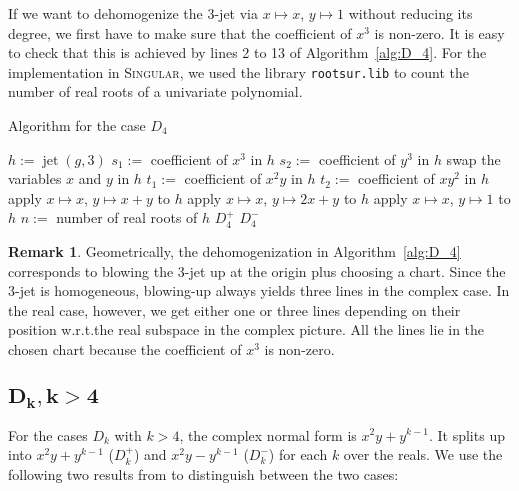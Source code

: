\documentclass[noend]{amsproc}
\theoremstyle{definition}
\newtheorem{remark}[theorem]{Remark}
\newcommand{\Singular}{\textsc{Singular}}
\DeclareMathOperator{\m}{\mathfrak{m}}
\DeclareMathOperator{\jet}{jet}
\begin{document}
If we want to dehomogenize the 3-jet via $x\mapsto x$, $y\mapsto 1$ without
reducing its degree, we first have to make sure that the coefficient of $x^3$
is non-zero. It is easy to check that this is achieved by lines 2 to 13 of
Algorithm~\ref{alg:D_4}. For the implementation in \Singular{}, we used the
library \texttt{rootsur.lib} \citep{roots} to count the number of real roots
of a univariate polynomial.

\begin{algorithm}[ht]
\caption{\label{alg:D_4}\label{D[4]} Algorithm for the case $D_4$}
\begin{algorithmic}[1]

\Require{$g\in \m^3\subset\mathbb Q[x,y]$ of complex singularity type $D_4$}
\State $h := \jet(g,3)$
\State $s_1:=$ coefficient of ${x^3}$ in $h$
\State $s_2 :=$ coefficient of ${y^3}$ in $h$
\State swap the variables $x$ and $y$ in $h$
\Else
\State $t_1:=$ coefficient of ${x^2y}$ in $h$
\State $t_2:=$ coefficient of ${xy^2}$ in $h$
\State apply $x\mapsto x$, $y\mapsto x+y$ to $h$
\Else
\State apply $x\mapsto x$, $y\mapsto 2x+y$ to $h$
\EndIf
\EndIf
\EndIf
\State apply $x\mapsto x$, $y\mapsto 1$ to $h$
\State $n :=$ number of real roots of $h$
\Return $D_4^+$
\Else
\Return $D_4^-$
\EndIf

\end{algorithmic}
\end{algorithm}

\begin{remark}
Geometrically, the dehomogenization in Algorithm~\ref{alg:D_4} corresponds to
blowing the 3-jet up at the origin plus choosing a chart. Since the 3-jet is
homogeneous, blowing-up always yields three lines in the complex case. In the
real case, however, we get either one or three lines depending on their
position w.r.t.\@ the real subspace in the complex picture. All the lines lie
in the chosen chart because the coefficient of $x^3$ is non-zero.
\end{remark}


\subsection{$\boldsymbol{D_k, k > 4}$}

For the cases $D_k$ with $k > 4$, the complex normal form is $x^2y+y^{k-1}$. It
splits up into $x^2y+y^{k-1}$ ($D_k^+$) and $x^2y-y^{k-1}$ ($D_k^-$) for each
$k$ over the reals. We use the following two results from
\citet[p.~35]{Siersma} to distinguish between the two cases:
\end{document}
